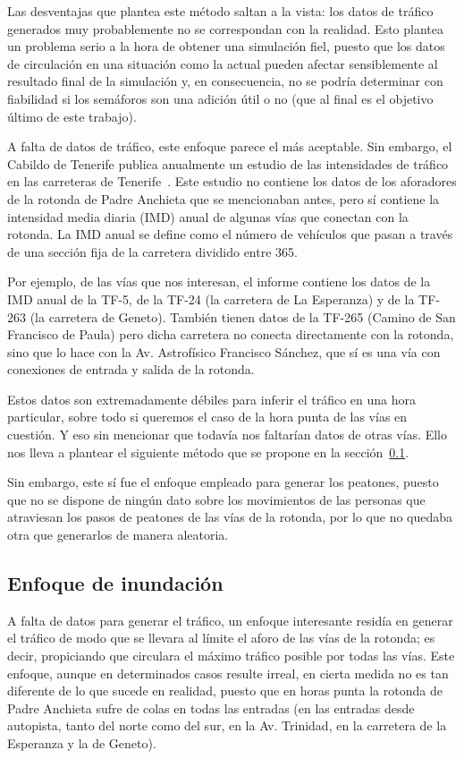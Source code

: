 Las desventajas que plantea este método saltan a la vista: los datos de tráfico generados muy probablemente no se correspondan con la realidad. Esto plantea un problema serio a la hora de obtener una simulación fiel, puesto que los datos de circulación en una situación como la actual pueden afectar sensiblemente al resultado final de la simulación y, en consecuencia, no se podría determinar con fiabilidad si los semáforos son una adición útil o no (que al final es el objetivo último de este trabajo).

A falta de datos de tráfico, este enfoque parece el más aceptable. Sin embargo, el Cabildo de Tenerife publica anualmente un estudio de las intensidades de tráfico en las carreteras de Tenerife~\cite{rodriguez_hernandez_intensidades_2019}. Este estudio no contiene los datos de los aforadores de la rotonda de Padre Anchieta que se mencionaban antes, pero sí contiene la intensidad media diaria (IMD) anual de algunas vías que conectan con la rotonda. La IMD anual se define como el número de vehículos que pasan a través de una sección fija de la carretera dividido entre 365.

Por ejemplo, de las vías que nos interesan, el informe contiene los datos de la IMD anual de la TF-5, de la TF-24 (la carretera de La Esperanza) y de la TF-263 (la carretera de Geneto). También tienen datos de la TF-265 (Camino de San Francisco de Paula) pero dicha carretera no conecta directamente con la rotonda, sino que lo hace con la Av. Astrofísico Francisco Sánchez, que sí es una vía con conexiones de entrada y salida de la rotonda.

Estos datos son extremadamente débiles para inferir el tráfico en una hora particular, sobre todo si queremos el caso de la hora punta de las vías en cuestión. Y eso sin mencionar que todavía nos faltarían datos de otras vías. Ello nos lleva a plantear el siguiente método que se propone en la sección~\ref{sec:inundacion}.

Sin embargo, este sí fue el enfoque empleado para generar los peatones, puesto que no se dispone de ningún dato sobre los movimientos de las personas que atraviesan los pasos de peatones de las vías de la rotonda, por lo que no quedaba otra que generarlos de manera aleatoria.


\subsection{Enfoque de inundación}
\label{sec:inundacion}


A falta de datos para generar el tráfico, un enfoque interesante residía en generar el tráfico de modo que se llevara al límite el aforo de las vías de la rotonda; es decir, propiciando que circulara el máximo tráfico posible por todas las vías. Este enfoque, aunque en determinados casos resulte irreal, en cierta medida no es tan diferente de lo que sucede en realidad, puesto que en horas punta la rotonda de Padre Anchieta sufre de colas en todas las entradas (en las entradas desde autopista, tanto del norte como del sur, en la Av. Trinidad, en la carretera de la Esperanza y la de Geneto).

